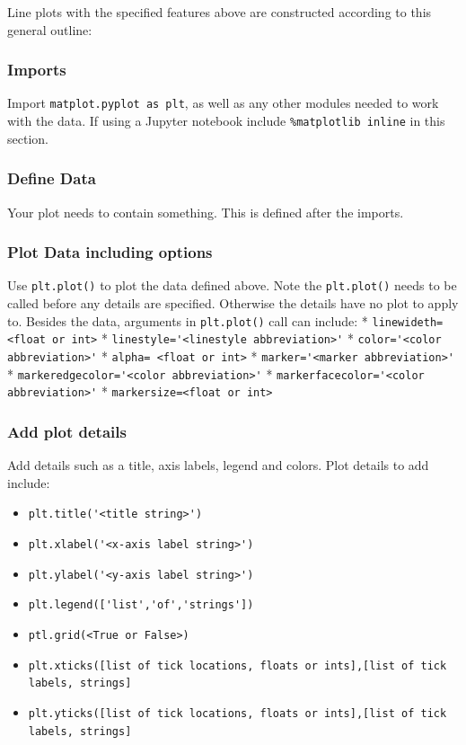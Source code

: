 \documentclass{book}
\providecommand{\tightlist}{%
      \setlength{\itemsep}{0pt}\setlength{\parskip}{0pt}}
\begin{document}
    
        Line plots with the specified features above are constructed according
to this general outline:

\subsubsection{Imports}\label{imports}

Import \lstinline!matplot.pyplot as plt!, as well as any other modules
needed to work with the data. If using a Jupyter notebook include
\lstinline!%matplotlib inline! in this section.

\subsubsection{Define Data}\label{define-data}

Your plot needs to contain something. This is defined after the imports.

\subsubsection{Plot Data including
options}\label{plot-data-including-options}

Use \lstinline!plt.plot()! to plot the data defined above. Note the
\lstinline!plt.plot()! needs to be called before any details are
specified. Otherwise the details have no plot to apply to. Besides the
data, arguments in \lstinline!plt.plot()! call can include: *
\lstinline!linewideth= <float or int>! *
\lstinline!linestyle='<linestyle abbreviation>'! *
\lstinline!color='<color abbreviation>'! *
\lstinline!alpha= <float or int>! *
\lstinline!marker='<marker abbreviation>'! *
\lstinline!markeredgecolor='<color abbreviation>'! *
\lstinline!markerfacecolor='<color abbreviation>'! *
\lstinline!markersize=<float or int>!

\subsubsection{Add plot details}\label{add-plot-details}

Add details such as a title, axis labels, legend and colors. Plot
details to add include:

\begin{itemize}
\tightlist
\item
  \lstinline!plt.title('<title string>')!
\item
  \lstinline!plt.xlabel('<x-axis label string>')!
\item
  \lstinline!plt.ylabel('<y-axis label string>')!
\item
  \lstinline!plt.legend(['list','of','strings'])!
\item
  \lstinline!ptl.grid(<True or False>)!
\item
  \lstinline!plt.xticks([list of tick locations, floats or ints],[list of tick labels, strings]!
\item
  \lstinline!plt.yticks([list of tick locations, floats or ints],[list of tick labels, strings]!
\end{itemize}
\end{document}
